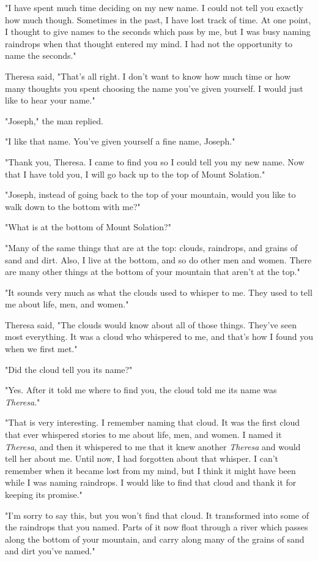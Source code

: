 "I have spent much time deciding on my new name. I could not tell you exactly how much though. Sometimes in the past, I have lost track of time. At one point, I thought to give names to the seconds which pass by me, but I was busy naming raindrops when that thought entered my mind. I had not the opportunity to name the seconds."

Theresa said, "That's all right. I don't want to know how much time or how many thoughts you spent choosing the name you've given yourself. I would just like to hear your name."

"Joseph," the man replied.

"I like that name. You've given yourself a fine name, Joseph."

"Thank you, Theresa. I came to find you so I could tell you my new name. Now that I have told you, I will go back up to the top of Mount Solation."

"Joseph, instead of going back to the top of your mountain, would you like to walk down to the bottom with me?"

"What is at the bottom of Mount Solation?"

"Many of the same things that are at the top: clouds, raindrops, and grains of sand and dirt. Also, I live at the bottom, and so do other men and women. There are many other things at the bottom of your mountain that aren't at the top."

"It sounds very much as what the clouds used to whisper to me. They used to tell me about life, men, and women."

Theresa said, "The clouds would know about all of those things. They've seen most everything. It was a cloud who whispered to me, and that's how I found you when we first met."

"Did the cloud tell you its name?"

"Yes. After it told me where to find you, the cloud told me its name was \textit{Theresa}."

"That is very interesting. I remember naming that cloud. It was the first cloud that ever whispered stories to me about life, men, and women. I named it \textit{Theresa}, and then it whispered to me that it knew another \textit{Theresa} and would tell her about me. Until now, I had forgotten about that whisper. I can't remember when it became lost from my mind, but I think it might have been while I was naming raindrops. I would like to find that cloud and thank it for keeping its promise."

"I'm sorry to say this, but you won't find that cloud. It transformed into some of the raindrops that you named. Parts of it now float through a river which passes along the bottom of your mountain, and carry along many of the grains of sand and dirt you've named."

